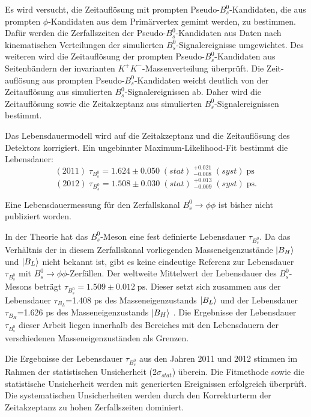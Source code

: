 \documentclass{article}
\begin{document}
Es wird versucht, die Zeitauflösung mit prompten Pseudo-$B_s^0$-Kandidaten, die aus prompten $\phi$-Kandidaten aus dem Primärvertex gemimt werden, zu bestimmen. Dafür werden die Zerfallszeiten der Pseudo-$B_s^0$-Kandidaten aus Daten nach kinematischen Verteilungen der simulierten $B_s^0$-Signalereignisse umgewichtet. Des weiteren wird die Zeitauflösung der prompten Pseudo-$B_s^0$-Kandidaten aus Seitenbändern der invarianten $K^+K^-$-Massenverteilung überprüft. Die Zeit-auflösung aus prompten Pseudo-$B_s^0$-Kandidaten weicht deutlich von der Zeitauflösung aus simulierten $B_s^0$-Signalereignissen ab. Daher wird die Zeitauflösung sowie die Zeitakzeptanz aus simulierten $B_s^0$-Signalereignissen bestimmt. 

Das Lebensdauermodell wird auf die Zeitakzeptanz und die Zeitauflösung des Detektors korrigiert. Ein ungebinnter Maximum-Likelihood-Fit bestimmt die Lebensdauer:
\[(2011)\;\tau_{B_s^0}=1.624\pm0.050\;(stat)\;^{+0.021}_{-0.008}\;(syst)\;\text{ps }\]
\[(2012)\;\tau_{B_s^0}=1.508\pm0.030\;(stat)\;^{+0.013}_{-0.009}\;(syst)\;\text{ps}.\]


Eine Lebensdauermessung für den Zerfallskanal $B_s^0\rightarrow \phi \phi$ ist bisher nicht publiziert worden. 

In der Theorie hat das $B_s^0$-Meson eine fest definierte Lebensdauer $\tau_{B_s^0}$. Da das Verhältnis der in diesem Zerfallskanal vorliegenden Masseneigenzustände $\ket{B_H}$ und $\ket{B_L}$ nicht bekannt ist, %
gibt es keine eindeutige Referenz zur Lebensdauer $\tau_{B_s^0}$ mit $B_s^0\rightarrow \phi \phi$-Zerfällen. Der weltweite Mittelwert der Lebensdauer des $B_s^0$-Mesons beträgt $\tau_{B_s^0}=1.509\pm0.012\;\text{ps}$. Dieser setzt sich zusammen aus der Lebensdauer $\tau_{B_L}$=1.408 ps des Masseneigenzustands $\ket{B_L}$ und der Lebensdauer $\tau_{B_H}$=1.626 ps des Masseneigenzustands $\ket{B_H}$ \cite{lifetime2}. Die Ergebnisse der Lebensdauer $\tau_{B_s^0}$ dieser Arbeit liegen innerhalb des Bereiches mit den Lebensdauern der verschiedenen Masseneigenzuständen als Grenzen.

Die Ergebnisse der Lebensdauer $\tau_{B_s^0}$ aus den Jahren 2011 und 2012 stimmen im Rahmen der statistischen Unsicherheit (2$\sigma_{stat}$) überein. Die Fitmethode sowie die statistische Unsicherheit werden mit generierten Ereignissen erfolgreich überprüft. Die systematischen Unsicherheiten werden durch den Korrekturterm der Zeitakzeptanz zu hohen Zerfallszeiten dominiert.
\end{document}
